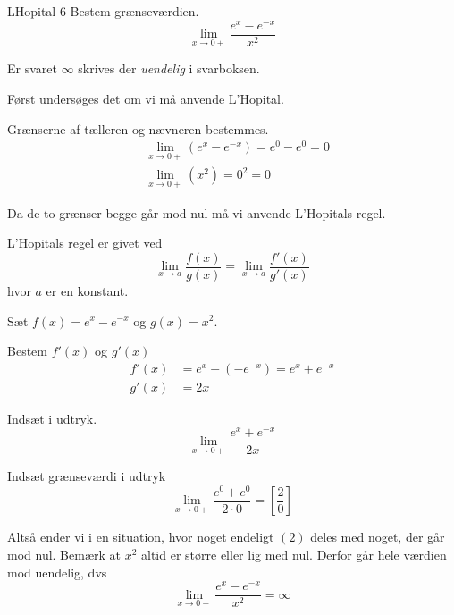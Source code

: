 \documentclass{article}
\begin{document}
\begin{exercise}{LHopital 6}
Bestem grænseværdien.
\[
\lim_{x \to 0+} \frac{e^x - e^{-x}}{x^2}
\] 

Er svaret $\infty$ skrives der \emph{uendelig} i svarboksen.


\hint
Først undersøges det om vi må anvende L'Hopital.

\hint
Grænserne af tælleren og nævneren bestemmes.
\begin{align*}
	&\lim_{x \to 0+} (e^x - e^{-x}) = e^0 - e^0 = 0 \\
	&\lim_{x \to 0+} (x^2)  = 0^2  = 0
\end{align*}

\hint
Da de to grænser begge går mod nul må vi  anvende L'Hopitals regel. 

\hint
L'Hopitals regel er givet ved
\[
\lim_{x \to a} \frac{f(x)}{g(x)} = \lim_{x \to a} \frac{f'(x)}{g'(x)} 
\]
hvor $a$  er en konstant.

\hint
Sæt $f(x) = e^x - e^{-x} $ og $g(x) = x^2$. 

\hint
Bestem $f'(x)$ og $g'(x)$
\begin{align*}
	f'(x) &= e^x - \left(- e^{-x} \right) = e^x + e^{-x} \\
	g'(x) &= 2x
\end{align*}

\hint
Indsæt i udtryk. 
\[
\lim_{x \to 0+} \frac{e^x + e^{-x}}{2x} 
\]

\hint
Indsæt grænseværdi i udtryk
\[
\lim_{x \to 0+} \frac{e^0 + e^0}{2 \cdot 0}  = \left[ \frac{2}{0}  \right] 
\]

\hint 
Altså ender vi i en situation, hvor noget endeligt $(2)$ deles med noget, der går mod nul. Bemærk at $x^2$ altid er større eller lig med nul. Derfor går hele værdien mod uendelig, dvs
\[
\lim_{x \to 0+} \frac{e^x - e^{-x}}{x^2} = \infty
\]

\end{exercise}
\end{document}
